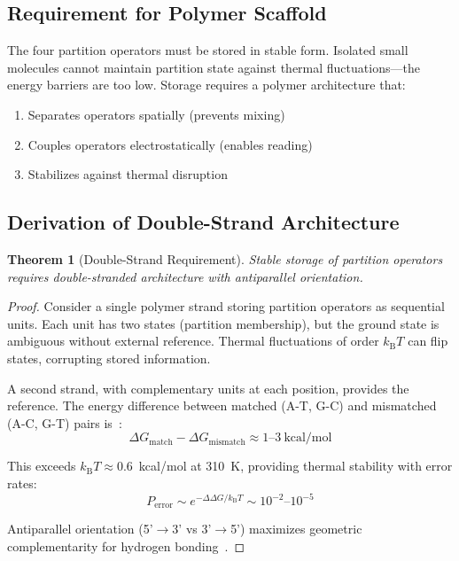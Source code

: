 \documentclass[twocolumn,aps,prb,superscriptaddress,longbibliography,floatfix]{revtex4-2}
\newtheorem{theorem}{Theorem}[section]
\theoremstyle{remark}
\newcommand{\kB}{k_\text{B}}
\begin{document}
\subsection{Requirement for Polymer Scaffold}

The four partition operators must be stored in stable form. Isolated
small molecules cannot maintain partition state against thermal
fluctuations---the energy barriers are too low. Storage requires a
polymer architecture that:
\begin{enumerate}
    \item Separates operators spatially (prevents mixing)
    \item Couples operators electrostatically (enables reading)
    \item Stabilizes against thermal disruption
\end{enumerate}

\subsection{Derivation of Double-Strand Architecture}

\begin{theorem}[Double-Strand Requirement]
\label{thm:doublestrand}
Stable storage of partition operators requires double-stranded
architecture with antiparallel orientation.
\end{theorem}

\begin{proof}
Consider a single polymer strand storing partition operators as
sequential units. Each unit has two states (partition membership), but
the ground state is ambiguous without external reference. Thermal
fluctuations of order $\kB T$ can flip states, corrupting stored
information.

A second strand, with complementary units at each position, provides
the reference. The energy difference between matched (A-T, G-C) and
mismatched (A-C, G-T) pairs is~\cite{SantaLucia1998}:
\begin{equation}
\Delta G_\text{match} - \Delta G_\text{mismatch} \approx 1\text{--}3~\text{kcal/mol}
\end{equation}

This exceeds $\kB T \approx 0.6$~kcal/mol at 310~K, providing thermal
stability with error rates:
\begin{equation}
P_\text{error} \sim e^{-\Delta\Delta G/\kB T} \sim 10^{-2}\text{--}10^{-5}
\end{equation}

Antiparallel orientation (5'$\to$3' vs 3'$\to$5') maximizes geometric
complementarity for hydrogen bonding~\cite{Franklin1953}.
\end{proof}
\end{document}
